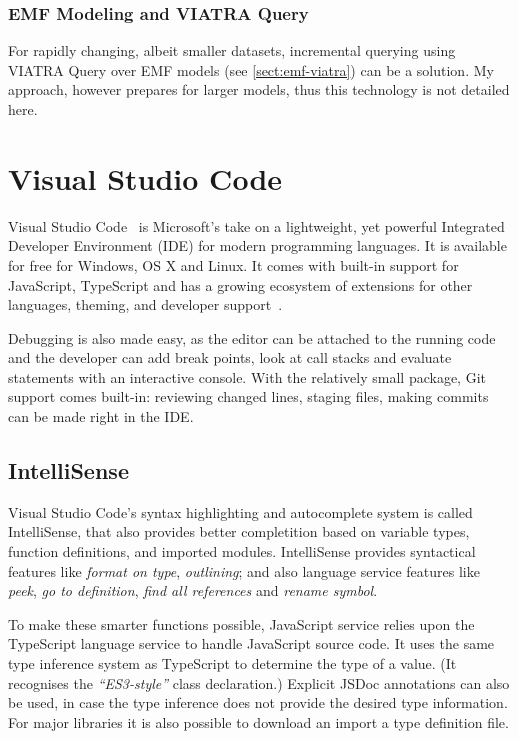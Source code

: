 \subsubsection{EMF Modeling and VIATRA Query}
For rapidly changing, albeit smaller datasets, incremental querying using VIATRA Query over EMF models (see \cref{sect:emf-viatra}) can be a solution. My approach, however prepares for larger models, thus this technology is not detailed here.


\section{Visual Studio Code}
Visual Studio Code~\cite{vscode} is Microsoft's take on a lightweight, yet powerful Integrated Developer Environment (IDE) for modern programming languages. It is available for free for Windows, OS X and Linux. It comes with built-in support for JavaScript, TypeScript and has a growing ecosystem of extensions for other languages, theming, and developer support~\cite{vscode-extensions}.

Debugging is also made easy, as the editor can be attached to the running code and the developer can add break points, look at call stacks and evaluate statements with an interactive console. With the relatively small package, Git support comes built-in: reviewing changed lines, staging files, making commits can be made right in the IDE.

\subsection{IntelliSense}
Visual Studio Code's syntax highlighting and autocomplete system is called IntelliSense, that also provides better completition based on variable types, function definitions, and imported modules. IntelliSense provides syntactical features like \emph{format on type}, \emph{outlining}; and also language service features like \emph{peek}, \emph{go to definition}, \emph{find all references} and \emph{rename symbol}.

To make these smarter functions possible, JavaScript service relies upon the TypeScript language service to handle JavaScript source code. It uses the same type inference system as TypeScript to determine the type of a value. (It recognises the \emph{``ES3-style''} class declaration.) Explicit JSDoc annotations can also be used, in case the type inference does not provide the desired type information. For major libraries it is also possible to download an import a type definition file.

